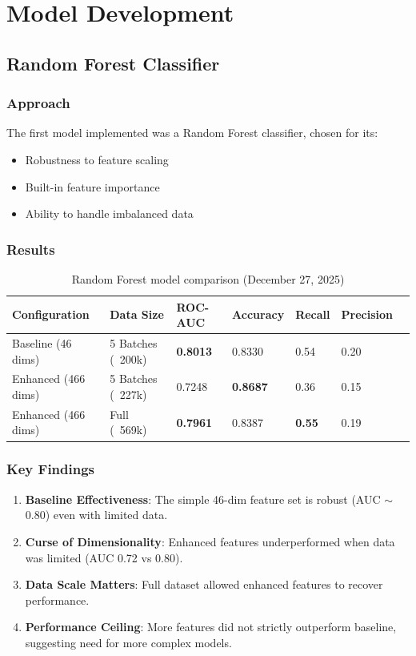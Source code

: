 \documentclass[11pt,a4paper]{article}
\begin{document}
\section{Model Development}

\subsection{Random Forest Classifier}

\subsubsection{Approach}
The first model implemented was a Random Forest classifier, chosen for its:
\begin{itemize}
    \item Robustness to feature scaling
    \item Built-in feature importance
    \item Ability to handle imbalanced data
\end{itemize}

\subsubsection{Results}

\begin{table}[h]
\centering
\begin{tabular}{@{}lllllll@{}}
\toprule
\textbf{Configuration} & \textbf{Data Size} & \textbf{ROC-AUC} & \textbf{Accuracy} & \textbf{Recall} & \textbf{Precision} \\ \midrule
Baseline (46 dims) & 5 Batches (~200k) & \textbf{0.8013} & 0.8330 & 0.54 & 0.20 \\
Enhanced (466 dims) & 5 Batches (~227k) & 0.7248 & \textbf{0.8687} & 0.36 & 0.15 \\
Enhanced (466 dims) & Full (~569k) & \textbf{0.7961} & 0.8387 & \textbf{0.55} & 0.19 \\ \bottomrule
\end{tabular}
\caption{Random Forest model comparison (December 27, 2025)}
\end{table}

\subsubsection{Key Findings}
\begin{enumerate}
    \item \textbf{Baseline Effectiveness}: The simple 46-dim feature set is robust (AUC $\sim$0.80) even with limited data.
    \item \textbf{Curse of Dimensionality}: Enhanced features underperformed when data was limited (AUC 0.72 vs 0.80).
    \item \textbf{Data Scale Matters}: Full dataset allowed enhanced features to recover performance.
    \item \textbf{Performance Ceiling}: More features did not strictly outperform baseline, suggesting need for more complex models.
\end{enumerate}
\end{document}
